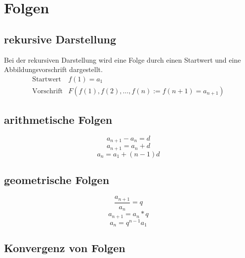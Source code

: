 \section{Folgen}

\subsection{rekursive Darstellung}
Bei der rekursiven Darstellung wird eine Folge durch einen Startwert und eine Abbildungsvorschrift dargestellt. \\
\[ \boxed{ \begin{matrix}
\text{Startwert} & f(1) = a_1 \\
\text{Vorschrift} & F(f(1), f(2), \ldots, f(n) := f(n + 1) = a_{n + 1})
\end{matrix}} \]

\subsection{arithmetische Folgen}
\[ \boxed{a_{n+1} - a_n = d} \]
\[ \boxed{a_{n+1} = a_n + d} \]
\[ \boxed{a_n = a_1 + (n - 1)d} \]

\subsection{geometrische Folgen}
\[ \boxed{\frac{a_{n+1}}{a_n} = q} \]
\[ \boxed{a_{n+1} = a_n * q} \]
\[ \boxed{a_n = q^{n-1} a_1} \]

\subsection{Konvergenz von Folgen}
